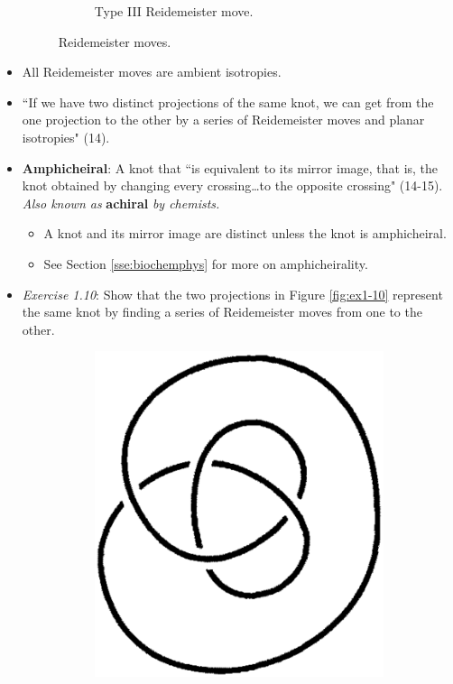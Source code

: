 \documentclass[titlepage]{article}
\numberwithin{figure}{section}
\numberwithin{table}{section}
\numberwithin{equation}{section}
\newcommand{\dq}[2]{``#1" (#2).}
\begin{document}
\begin{itemize}
\begin{figure}[h!]
\begin{subfigure}[b]{0.6\linewidth}
            \caption{Type III Reidemeister move.}
            \label{fig:reidemc}
        \end{subfigure}
        \caption{Reidemeister moves.}
        \label{fig:reidem}
    \end{figure}
    \item All Reidemeister moves are ambient isotropies.
    \item \dq{If we have two distinct projections of the same knot, we can get from the one projection to the other by a series of Reidemeister moves and planar isotropies}{14}
    \item \textbf{Amphicheiral}: A knot that \dq{is equivalent to its mirror image, that is, the knot obtained by changing every crossing\dots to the opposite crossing}{14-15} \emph{Also known as} \textbf{achiral} \emph{by chemists.}
    \begin{itemize}
        \item A knot and its mirror image are distinct unless the knot is amphicheiral.
        \item See Section \ref{sse:biochemphys} for more on amphicheirality.
    \end{itemize}
    \newpage
    \item \emph{Exercise 1.10}: Show that the two projections in Figure \ref{fig:ex1-10} represent the same knot by finding a series of Reidemeister moves from one to the other.
    \begin{figure}[h!]
        \centering
        \begin{subfigure}[b]{0.2\linewidth}
            \centering
            \includegraphics[width=0.6\linewidth]{Blender/ex1-10a.png}

\end{subfigure}
\end{figure}
\end{itemize}
\end{document}
